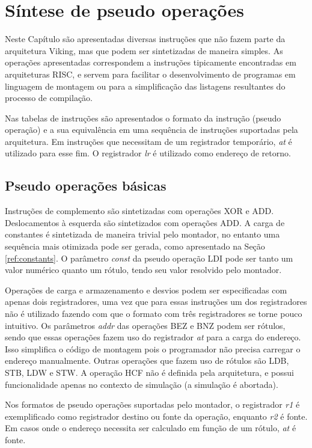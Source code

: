 \documentclass{extreport}
\begin{document}
\chapter{Síntese de pseudo operações}
\label{ref:pseudo_ops}

Neste Capítulo são apresentadas diversas instruções que não fazem parte da arquitetura Viking, mas que podem ser sintetizadas de maneira simples. As operações apresentadas correspondem a instruções tipicamente encontradas em arquiteturas RISC, e servem para facilitar o desenvolvimento de programas em linguagem de montagem ou para a simplificação das listagens resultantes do processo de compilação.

Nas tabelas de instruções são apresentados o formato da instrução (pseudo operação) e a sua equivalência em uma sequência de instruções suportadas pela arquitetura. Em instruções que necessitam de um registrador temporário, \textit{at} é utilizado para esse fim. O registrador \textit{lr} é utilizado como endereço de retorno.

\section{Pseudo operações básicas}

Instruções de complemento são sintetizadas com operações XOR e ADD. Deslocamentos à esquerda são sintetizados com operações ADD. A carga de constantes é sintetizada de maneira trivial pelo montador, no entanto uma sequência mais otimizada pode ser gerada, como apresentado na Seção \ref{ref:constants}. O parâmetro \textit{const} da pseudo operação LDI pode ser tanto um valor numérico quanto um rótulo, tendo seu valor resolvido pelo montador.

Operações de carga e armazenamento e desvios podem ser especificadas com apenas dois registradores, uma vez que para essas instruções um dos registradores não é utilizado fazendo com que o formato com três registradores se torne pouco intuitivo. Os parâmetros \textit{addr} das operações BEZ e BNZ podem ser rótulos, sendo que essas operações fazem uso do registrador \textit{at} para a carga do endereço. Isso simplifica o código de montagem pois o programador não precisa carregar o endereço manualmente. Outras operações que fazem uso de rótulos são LDB, STB, LDW e STW. A operação HCF não é definida pela arquitetura, e possui funcionalidade apenas no contexto de simulação (a simulação é abortada).

Nos formatos de pseudo operações suportadas pelo montador, o registrador \textit{r1} é exemplificado como registrador destino ou fonte da operação, enquanto \textit{r2} é fonte. Em casos onde o endereço necessita ser calculado em função de um rótulo, \textit{at} é fonte.
\end{document}
